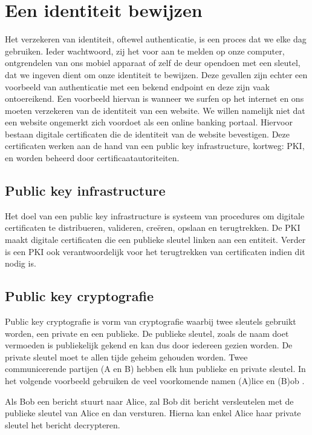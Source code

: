 \chapter{Een identiteit bewijzen}
\label{ch:identiteit-bewijzen}

Het verzekeren van identiteit, oftewel authenticatie, is een proces dat we elke
dag gebruiken. Ieder wachtwoord, zij het voor aan te melden op onze computer,
ontgrendelen van ons mobiel apparaat of zelf de deur opendoen met een sleutel,
dat we ingeven dient om onze identiteit te bewijzen. Deze gevallen zijn echter
een voorbeeld van authenticatie met een bekend endpoint en deze zijn vaak
ontoereikend. Een voorbeeld hiervan is wanneer we surfen op het internet en ons
moeten verzekeren van de identiteit van een website. We willen namelijk niet dat
een website ongemerkt zich voordoet als een online banking portaal. Hiervoor
bestaan digitale certificaten die de identiteit van de website bevestigen. Deze
certificaten werken aan de hand van een public key infrastructure, kortweg: PKI,
en worden beheerd door certificaatautoriteiten.

\section{Public key infrastructure}
\label{sec:public-key-infrastructure}

Het doel van een public key infrastructure is systeem van procedures om digitale
certificaten te distribueren, valideren, creëren, opslaan en terugtrekken. De
PKI maakt digitale certificaten die een publieke sleutel linken aan een
entiteit. Verder is een PKI ook verantwoordelijk voor het terugtrekken van
certificaten indien dit nodig is.

\section{Public key cryptografie}
\label{sec:public-key-cryptografie}

Public key cryptografie is vorm van cryptografie waarbij twee sleutels gebruikt
worden, een private en een publieke. De publieke sleutel, zoals de naam doet
vermoeden is publiekelijk gekend en kan dus door iedereen gezien worden. De
private sleutel moet te allen tijde geheim gehouden worden. Twee communicerende
partijen (A en B) hebben elk hun publieke en private sleutel. In het volgende
voorbeeld gebruiken de veel voorkomende namen (A)lice en (B)ob
\autocite{Rivest1978}.

Als Bob een bericht stuurt naar Alice, zal Bob dit bericht versleutelen met de
publieke sleutel van Alice en dan versturen. Hierna kan enkel Alice haar private
sleutel het bericht decrypteren.

